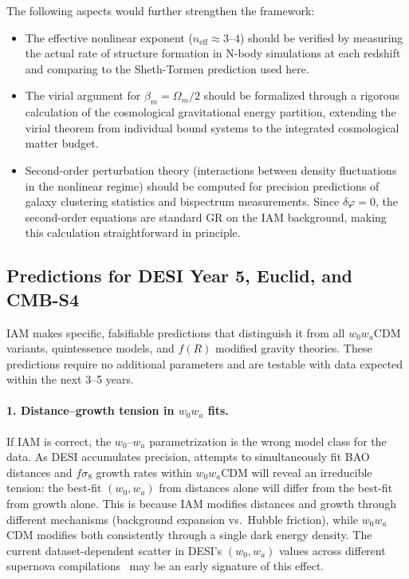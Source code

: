 \documentclass[aps,prd,twocolumn,superscriptaddress,nofootinbib]{revtex4-2}
\begin{document}
The following aspects would further strengthen the framework:
\begin{itemize}
\item The effective nonlinear exponent ($n_\text{eff} \approx 3$--$4$) should be verified by measuring the actual rate of structure formation in N-body simulations at each redshift and comparing to the Sheth-Tormen prediction used here.
\item The virial argument for $\beta_m = \Omega_m/2$ should be formalized through a rigorous calculation of the cosmological gravitational energy partition, extending the virial theorem from individual bound systems to the integrated cosmological matter budget.
\item Second-order perturbation theory (interactions between density fluctuations in the nonlinear regime) should be computed for precision predictions of galaxy clustering statistics and bispectrum measurements. Since $\delta\varphi = 0$, the second-order equations are standard GR on the IAM background, making this calculation straightforward in principle.
\end{itemize}

\subsection{Predictions for DESI Year 5, Euclid, and CMB-S4}

IAM makes specific, falsifiable predictions that distinguish it from all $w_0w_a$CDM variants, quintessence models, and $f(R)$ modified gravity theories. These predictions require no additional parameters and are testable with data expected within the next 3--5 years.

\paragraph{1. Distance--growth tension in $w_0w_a$ fits.}
If IAM is correct, the $w_0$--$w_a$ parametrization is the wrong model class for the data. As DESI accumulates precision, attempts to simultaneously fit BAO distances and $f\sigma_8$ growth rates within $w_0w_a$CDM will reveal an irreducible tension: the best-fit $(w_0, w_a)$ from distances alone will differ from the best-fit from growth alone. This is because IAM modifies distances and growth through different mechanisms (background expansion vs.\ Hubble friction), while $w_0w_a$CDM modifies both consistently through a single dark energy density. The current dataset-dependent scatter in DESI's $(w_0, w_a)$ values across different supernova compilations~\cite{DESI2025DR2} may be an early signature of this effect.
\end{document}
